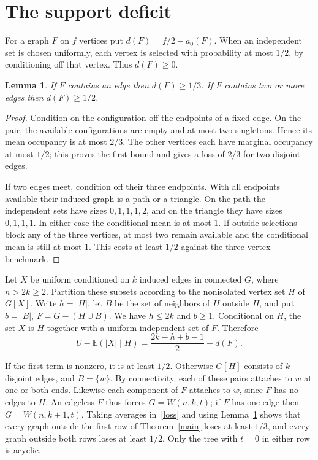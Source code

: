 \documentclass[11pt,a4paper]{article}
\newtheorem{lem}[thm]{Lemma}
\newcommand{\av}{a}
\newcommand{\E}{\mathbb E}
\begin{document}
\section{The support deficit}
For a graph $F$ on $f$ vertices put $d(F)=f/2-\av_0(F)$. When an independent set is chosen uniformly, each vertex is selected with probability at most $1/2$, by conditioning off that vertex. Thus $d(F)\ge0$.
\begin{lem}\label{gap}
If $F$ contains an edge then $d(F)\ge1/3$. If $F$ contains two or more edges then $d(F)\ge1/2$.
\end{lem}
\begin{proof}
Condition on the configuration off the endpoints of a fixed edge. On the pair, the available configurations are empty and at most two singletons. Hence its mean occupancy is at most $2/3$. The other vertices each have marginal occupancy at most $1/2$; this proves the first bound and gives a loss of $2/3$ for two disjoint edges.

If two edges meet, condition off their three endpoints. With all endpoints available their induced graph is a path or a triangle. On the path the independent sets have sizes $0,1,1,1,2$, and on the triangle they have sizes $0,1,1,1$. In either case the conditional mean is at most $1$. If outside selections block any of the three vertices, at most two remain available and the conditional mean is still at most $1$. This costs at least $1/2$ against the three-vertex benchmark.
\end{proof}
Let $X$ be uniform conditioned on $k$ induced edges in connected $G$, where $n>2k\ge2$. Partition these subsets according to the nonisolated vertex set $H$ of $G[X]$. Write $h=|H|$, let $B$ be the set of neighbors of $H$ outside $H$, and put $b=|B|$, $F=G-(H\cup B)$. We have $h\le2k$ and $b\ge1$. Conditional on $H$, the set $X$ is $H$ together with a uniform independent set of $F$. Therefore
\begin{equation}\label{loss}
U-\E(|X|\mid H)=\frac{2k-h+b-1}{2}+d(F).
\end{equation}

If the first term is nonzero, it is at least $1/2$. Otherwise $G[H]$ consists of $k$ disjoint edges, and $B=\{w\}$. By connectivity, each of these pairs attaches to $w$ at one or both ends. Likewise each component of $F$ attaches to $w$, since $F$ has no edges to $H$. An edgeless $F$ thus forces $G=W(n,k,t)$; if $F$ has one edge then $G=W(n,k+1,t)$. Taking averages in~\eqref{loss} and using Lemma~\ref{gap} shows that every graph outside the first row of Theorem~\ref{main} loses at least $1/3$, and every graph outside both rows loses at least $1/2$. Only the tree with $t=0$ in either row is acyclic.
\end{document}
